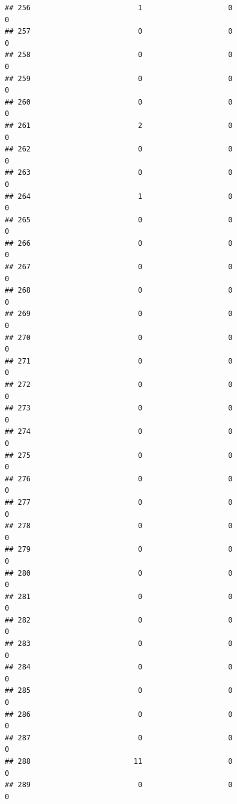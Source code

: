 \documentclass[
]{article}
\begin{document}
\begin{verbatim}
## 256                         1                    0                      0
## 257                         0                    0                      0
## 258                         0                    0                      0
## 259                         0                    0                      0
## 260                         0                    0                      0
## 261                         2                    0                      0
## 262                         0                    0                      0
## 263                         0                    0                      0
## 264                         1                    0                      0
## 265                         0                    0                      0
## 266                         0                    0                      0
## 267                         0                    0                      0
## 268                         0                    0                      0
## 269                         0                    0                      0
## 270                         0                    0                      0
## 271                         0                    0                      0
## 272                         0                    0                      0
## 273                         0                    0                      0
## 274                         0                    0                      0
## 275                         0                    0                      0
## 276                         0                    0                      0
## 277                         0                    0                      0
## 278                         0                    0                      0
## 279                         0                    0                      0
## 280                         0                    0                      0
## 281                         0                    0                      0
## 282                         0                    0                      0
## 283                         0                    0                      0
## 284                         0                    0                      0
## 285                         0                    0                      0
## 286                         0                    0                      0
## 287                         0                    0                      0
## 288                        11                    0                      0
## 289                         0                    0                      0

\end{verbatim}
\end{document}
